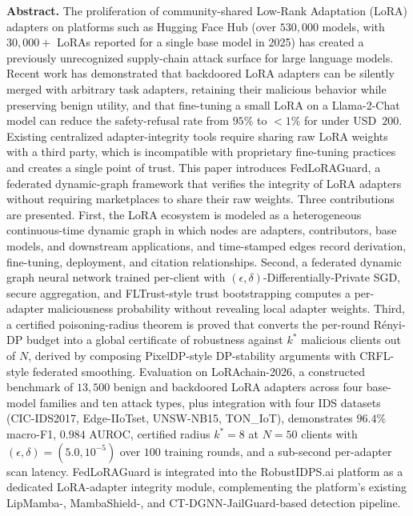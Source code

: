 \documentclass[12pt,a4paper]{article}
\theoremstyle{definition}
\theoremstyle{remark}
\newcommand{\modelname}{FedLoRAGuard}
\newcommand{\benchname}{LoRAchain-2026}
\begin{document}
\noindent\textbf{Abstract.}
The proliferation of community-shared Low-Rank Adaptation (LoRA) adapters on platforms such as Hugging Face Hub (over $530{,}000$ models, with $30{,}000+$ LoRAs reported for a single base model in 2025) has created a previously unrecognized supply-chain attack surface for large language models. Recent work has demonstrated that backdoored LoRA adapters can be silently merged with arbitrary task adapters, retaining their malicious behavior while preserving benign utility, and that fine-tuning a small LoRA on a Llama-2-Chat model can reduce the safety-refusal rate from $95\%$ to $<1\%$ for under USD~$200$. Existing centralized adapter-integrity tools require sharing raw LoRA weights with a third party, which is incompatible with proprietary fine-tuning practices and creates a single point of trust. This paper introduces \modelname{}, a federated dynamic-graph framework that verifies the integrity of LoRA adapters without requiring marketplaces to share their raw weights. Three contributions are presented. First, the LoRA ecosystem is modeled as a heterogeneous continuous-time dynamic graph in which nodes are adapters, contributors, base models, and downstream applications, and time-stamped edges record derivation, fine-tuning, deployment, and citation relationships. Second, a federated dynamic graph neural network trained per-client with $(\epsilon,\delta)$-Differentially-Private SGD, secure aggregation, and FLTrust-style trust bootstrapping computes a per-adapter maliciousness probability without revealing local adapter weights. Third, a certified poisoning-radius theorem is proved that converts the per-round R\'enyi-DP budget into a global certificate of robustness against $k^*$ malicious clients out of $N$, derived by composing PixelDP-style DP-stability arguments with CRFL-style federated smoothing. Evaluation on \benchname{}, a constructed benchmark of $13{,}500$ benign and backdoored LoRA adapters across four base-model families and ten attack types, plus integration with four IDS datasets (CIC-IDS2017, Edge-IIoTset, UNSW-NB15, TON\_IoT), demonstrates $96.4\%$ macro-F1, $0.984$ AUROC, certified radius $k^* = 8$ at $N = 50$ clients with $(\epsilon, \delta) = (5.0, 10^{-5})$ over $100$ training rounds, and a sub-second per-adapter scan latency. \modelname{} is integrated into the RobustIDPS.ai platform as a dedicated LoRA-adapter integrity module, complementing the platform's existing LipMamba-, MambaShield-, and CT-DGNN-JailGuard-based detection pipeline.

\vspace{0.4em}
\end{document}
